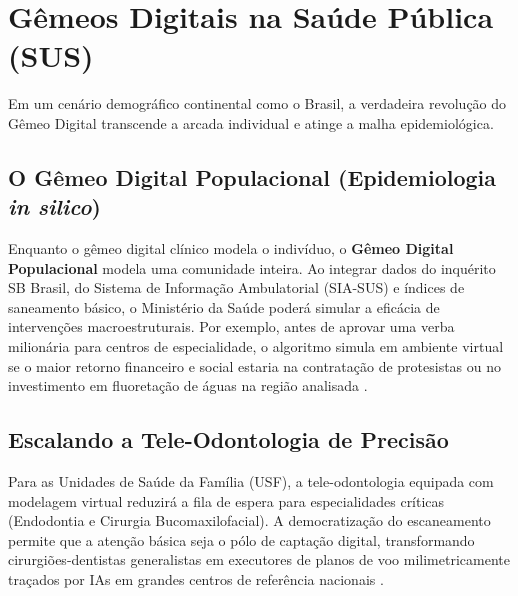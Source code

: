\section{Gêmeos Digitais na Saúde Pública (SUS)}

Em um cenário demográfico continental como o Brasil, a verdadeira revolução do Gêmeo Digital transcende a arcada individual e atinge a malha epidemiológica. 

\subsection{O Gêmeo Digital Populacional (Epidemiologia \textit{in silico})}

Enquanto o gêmeo digital clínico modela o indivíduo, o \textbf{Gêmeo Digital Populacional} modela uma comunidade inteira. Ao integrar dados do inquérito SB Brasil, do Sistema de Informação Ambulatorial (SIA-SUS) e índices de saneamento básico, o Ministério da Saúde poderá simular a eficácia de intervenções macroestruturais. Por exemplo, antes de aprovar uma verba milionária para centros de especialidade, o algoritmo simula em ambiente virtual se o maior retorno financeiro e social estaria na contratação de protesistas ou no investimento em fluoretação de águas na região analisada \cite{frota2025sus}.

\subsection{Escalando a Tele-Odontologia de Precisão}

Para as Unidades de Saúde da Família (USF), a tele-odontologia equipada com modelagem virtual reduzirá a fila de espera para especialidades críticas (Endodontia e Cirurgia Bucomaxilofacial). A democratização do escaneamento permite que a atenção básica seja o pólo de captação digital, transformando cirurgiões-dentistas generalistas em executores de planos de voo milimetricamente traçados por IAs em grandes centros de referência nacionais \cite{d24am2026gemeos}.

